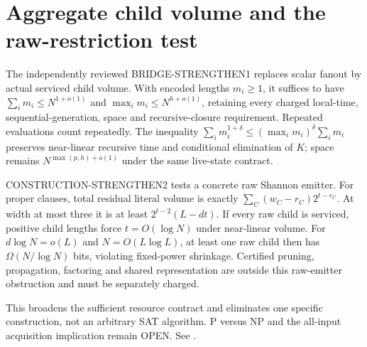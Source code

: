 \section{Aggregate child volume and the raw-restriction test}
The independently reviewed BRIDGE-STRENGTHEN1 replaces scalar fanout by
actual serviced child volume. With encoded lengths $m_i\ge1$, it suffices
to have $\sum_i m_i\le N^{1+o(1)}$ and $\max_i m_i\le N^{h+o(1)}$,
retaining every charged local-time, sequential-generation, space and
recursive-closure requirement. Repeated evaluations count repeatedly.
The inequality $\sum_i m_i^{1+\delta}\le(\max_i m_i)^\delta\sum_i m_i$
preserves near-linear recursive time and conditional elimination of $K$;
space remains $N^{\max(p,h)+o(1)}$ under the same live-state contract.

CONSTRUCTION-STRENGTHEN2 tests a concrete raw Shannon emitter. For proper
clauses, total residual literal volume is exactly
$\sum_C (w_C-r_C)2^{t-r_C}$. At width at most three it is at least
$2^{t-2}(L-dt)$. If every raw child is serviced, positive child lengths
force $t=O(\log N)$ under near-linear volume. For
$d\log N=o(L)$ and $N=O(L\log L)$, at least one raw child then has
$\Omega(N/\log N)$ bits, violating fixed-power shrinkage.
Certified pruning, propagation, factoring and shared representation are
outside this raw-emitter obstruction and must be separately charged.

This broadens the sufficient resource contract and eliminates one
specific construction, not an arbitrary SAT algorithm.
P versus NP and the all-input acquisition implication remain OPEN.
See .
